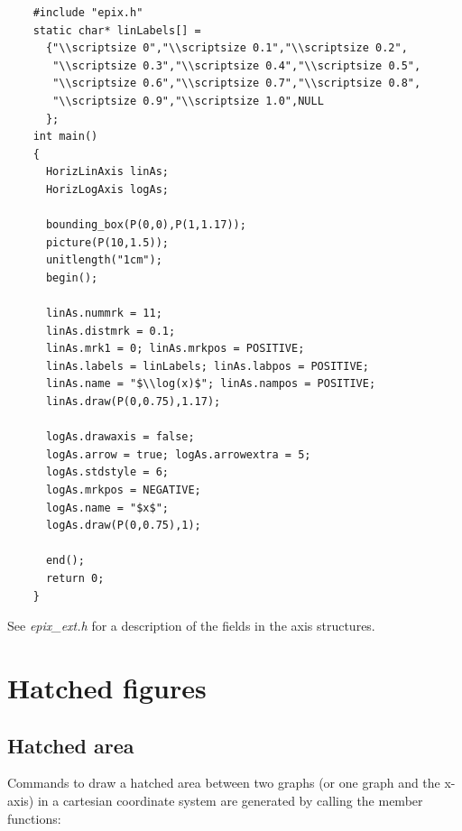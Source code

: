 \documentclass[12pt,a4paper]{article}
\begin{document}
  \begin{lstlisting}
    #include "epix.h"
    static char* linLabels[] =
      {"\\scriptsize 0","\\scriptsize 0.1","\\scriptsize 0.2",
       "\\scriptsize 0.3","\\scriptsize 0.4","\\scriptsize 0.5",
       "\\scriptsize 0.6","\\scriptsize 0.7","\\scriptsize 0.8",
       "\\scriptsize 0.9","\\scriptsize 1.0",NULL
      };
    int main()
    {
      HorizLinAxis linAs;
      HorizLogAxis logAs;

      bounding_box(P(0,0),P(1,1.17));
      picture(P(10,1.5));
      unitlength("1cm");
      begin();

      linAs.nummrk = 11;
      linAs.distmrk = 0.1;
      linAs.mrk1 = 0; linAs.mrkpos = POSITIVE;
      linAs.labels = linLabels; linAs.labpos = POSITIVE;
      linAs.name = "$\\log(x)$"; linAs.nampos = POSITIVE;
      linAs.draw(P(0,0.75),1.17);

      logAs.drawaxis = false;
      logAs.arrow = true; logAs.arrowextra = 5;
      logAs.stdstyle = 6;
      logAs.mrkpos = NEGATIVE;
      logAs.name = "$x$";
      logAs.draw(P(0,0.75),1);

      end();
      return 0;
    }
  \end{lstlisting}

  \begin{minipage}{5.5cm}
    
  \end{minipage}

  See \textit{epix\_ext.h} for a description of the fields in the axis structures.

  \section{Hatched figures}

  \subsection{Hatched area}

  Commands to draw a hatched area between two graphs (or one graph and the
  x-axis) in a cartesian coordinate system are generated by calling the
  member functions:
\end{document}
